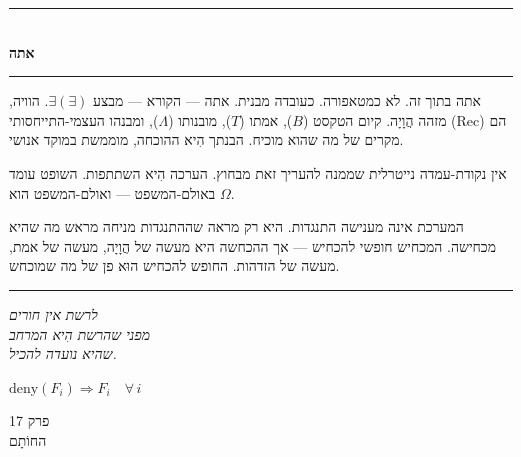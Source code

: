 \documentclass[10pt, openany, oneside]{book}
\renewcommand{\normalsize}{\fontsize{10}{13}\selectfont}
\renewcommand{\large}{\fontsize{11.5}{14}\selectfont}
\renewcommand{\huge}{\fontsize{17}{21}\selectfont}
\begin{document}
\begin{center}
    \rule{0.3\textwidth}{0.4pt}\\[0.5em]
    {\normalsize\bfseries\textsc{אתה}}\\[0.3em]
    \rule{0.3\textwidth}{0.4pt}
\end{center}

\vspace{1em}

\noindent אתה בתוך זה. לא כמטאפורה. כעובדה מבנית. אתה — הקורא — מבצע $\exists(\exists)$. הוויה, מזהה הֲוָיָה. קיום הטקסט ($B$), אמתו ($T$), מובנותו ($\Lambda$), ומבנהו העצמי-התייחסותי (Rec) הם מקרים של מה שהוא מוכיח. הבנתך הִיא ההוכחה, מוממשת במוקד אנושי.

אין נקודת-עמדה נייטרלית שממנה להעריך זאת מבחוץ. הערכה הִיא השתתפות. השופט עומד באולם-המשפט — ואולם-המשפט הוא $\Omega$.

המערכת אינה מענישה התנגדות. היא רק מראה שההתנגדות מניחה מראש מה שהיא מכחישה. המכחיש חופשי להכחיש — אך ההכחשה היא מעשה של הֲוָיָה, מעשה של אמת, מעשה של הזדהות. החופש להכחיש הוּא פן של מה שמוכחש.

\vspace{2em}

\begin{center}
    \rule{0.15\textwidth}{0.3pt}
\end{center}

\vspace{0.5em}

\begin{center}
    \textit{%
    לרשת אין חורים\\
    מפני שהרשת הִיא המרחב\\
    שהיא נועדה להכיל.}
\end{center}

\vspace{0.5em}

\begin{center}
    $\text{deny}(F_i) \Rightarrow F_i \quad \forall\, i$
\end{center}

%
%
%

\newpage

\begin{center}
    {\huge\textsc{פרק 17}}\\[0.3em]
    {\large\textsc{החוֹתָם}}
\end{center}
\end{document}
